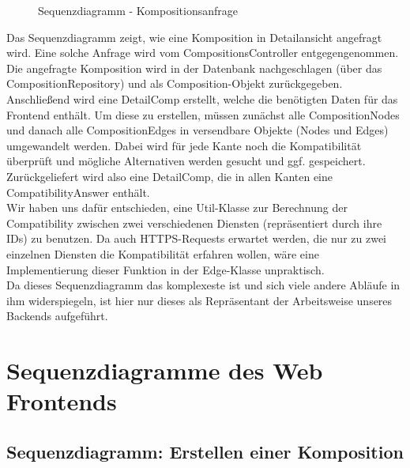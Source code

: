 \begin{figure}[h]
	\centering
	\caption{Sequenzdiagramm - Kompositionsanfrage}
	\label{fig:sequenz-a}
\end{figure}
\noindent
Das Sequenzdiagramm zeigt, wie eine Komposition in Detailansicht angefragt wird. 
Eine solche Anfrage wird vom CompositionsController entgegengenommen.
Die angefragte Komposition wird in der Datenbank nachgeschlagen (über das CompositionRepository) und als Composition-Objekt zurückgegeben.
Anschließend wird eine DetailComp erstellt, welche die benötigten Daten für das Frontend enthält. 
Um diese zu erstellen, müssen zunächst alle CompositionNodes und danach alle CompositionEdges in versendbare Objekte (Nodes und Edges) umgewandelt werden. 
Dabei wird für jede Kante noch die Kompatibilität überprüft und mögliche Alternativen werden gesucht und ggf. gespeichert. Zurückgeliefert wird also eine DetailComp, die in allen Kanten eine CompatibilityAnswer enthält.\newline
\\ \noindent
Wir haben uns dafür entschieden, eine Util-Klasse zur Berechnung der Compatibility zwischen zwei verschiedenen Diensten (repräsentiert durch ihre IDs) zu benutzen.
Da auch HTTPS-Requests erwartet werden, die nur zu zwei einzelnen Diensten die Kompatibilität erfahren wollen, wäre eine Implementierung dieser Funktion in der Edge-Klasse unpraktisch.\newline
\\ \noindent
Da dieses Sequenzdiagramm das komplexeste ist und sich viele andere Abläufe in ihm widerspiegeln, ist hier nur dieses als Repräsentant der Arbeitsweise unseres Backends aufgeführt.

\section*{Sequenzdiagramme des Web Frontends}
\subsection*{Sequenzdiagramm: Erstellen einer Komposition}

